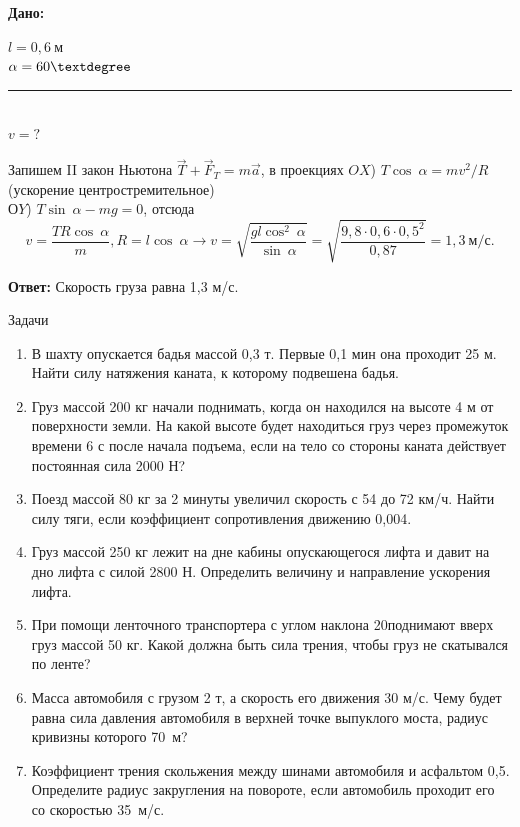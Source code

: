 \documentclass[a6paper, 11pt]{diss_4}
\renewcommand{\'}{\,'}
\begin{document}
\hspace{1cm}\textbf{Дано:}\hspace{.3cm}
\parbox[t]{4cm}{
$l = 0,6\ м$\\
$\alpha=60\textdegree$\\
\rule{4cm}{.4pt}\\
$v = ?$\\
}

Запишем II закон Ньютона $\vec{T}+\vec{F}_T=m\vec{a}$, в проекциях
$OX$) $T\cos\ \alpha=mv^2/R$ (ускорение центростремительное)\\
$ОY$) $T\sin\ \alpha-mg=0$, отсюда
\[
v=\frac{TR\cos\ \alpha}{m},R=l\cos\ \alpha\to
v=\sqrt{\frac{gl\cos^2\ \alpha}{\sin\ \alpha}}=\sqrt{\frac{9,8\cdot0,6\cdot0,5^2}{0,87}}=1,3\ м/с.
\]

\textbf{Ответ:} Скорость груза равна 1,3 м/с.

\begin{center}
   Задачи
\end{center}
\begin{enumerate}

\item В шахту опускается бадья массой 0,3 т. Первые 0,1 мин она проходит 25 м. Найти силу натяжения каната, к которому подвешена бадья.

\item Груз массой 200 кг начали поднимать, когда он находился на высоте 4 м от поверхности земли. На какой высоте будет находиться груз через промежуток времени 6 с после начала подъема, если на тело со стороны каната действует постоянная сила 2000 Н?

\item Поезд массой 80 кг за 2 минуты увеличил скорость с 54 до 72 км/ч. Найти силу тяги, если коэффициент сопротивления движению 0,004.

\item Груз массой 250 кг лежит на дне кабины опускающегося лифта и давит на дно лифта с силой 2800 Н. Определить величину и направление ускорения лифта.

\item При помощи ленточного транспортера с углом наклона 20\textdegree поднимают вверх груз массой 50 кг. Какой должна быть сила трения, чтобы груз не скатывался по ленте?

\item Масса автомобиля с грузом 2 т, а скорость его движения 30 м/с. Чему будет равна сила давления автомобиля в верхней точке выпуклого моста, радиус кривизны которого 70 м?

\item Коэффициент трения скольжения между шинами автомобиля и асфальтом 0,5. Определите радиус закругления на повороте, если автомобиль проходит его со скоростью 35 м/с.

\end{enumerate}
\end{document}
